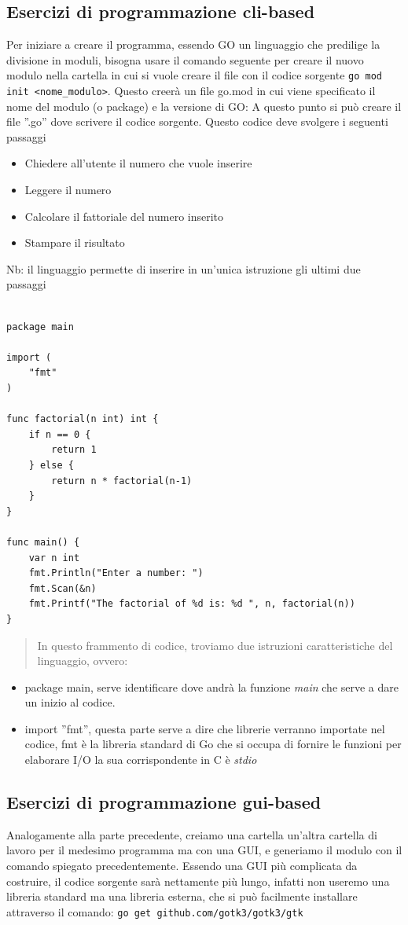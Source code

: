 \subsection{Esercizi di programmazione cli-based}
Per iniziare a creare il programma, essendo GO un linguaggio che predilige la divisione in moduli, bisogna usare il comando seguente per creare il nuovo modulo nella cartella in cui si vuole creare il file con il codice sorgente \texttt{go mod init <nome\_modulo>}.\newline 
Questo creerà un file go.mod in cui viene specificato il nome del modulo (o package) e la versione di GO:
A questo punto si può creare il file ''.go'' dove scrivere il codice sorgente.
Questo codice deve svolgere i seguenti passaggi
\begin{itemize}
\item Chiedere all'utente il numero che vuole inserire
\item Leggere il numero
\item Calcolare il fattoriale del numero inserito
\item Stampare il risultato
\end{itemize}
Nb: il linguaggio permette di inserire in un'unica istruzione gli ultimi due passaggi

\begin{lstlisting}
  
package main

import (
	"fmt"
)

func factorial(n int) int {
	if n == 0 {
		return 1
	} else {
		return n * factorial(n-1)
	}
}

func main() {
	var n int
	fmt.Println("Enter a number: ")
	fmt.Scan(&n)
	fmt.Printf("The factorial of %d is: %d ", n, factorial(n))
}
\end{lstlisting}
\begin{quote}
In questo frammento di codice, troviamo due istruzioni caratteristiche del linguaggio, ovvero:
\end{quote}
\begin{itemize}
\item package main, serve identificare dove andrà la funzione \emph{main} che serve a dare un inizio al codice.
\item  import ''fmt'', questa parte serve a dire che librerie verranno importate nel codice, fmt è la libreria standard di Go che si occupa di fornire le funzioni per elaborare I/O la sua corrispondente in C è \emph{stdio}
\end{itemize}
\subsection{Esercizi di programmazione gui-based}
Analogamente alla parte precedente, creiamo una cartella un'altra cartella di lavoro per il medesimo programma ma con una GUI, e generiamo il modulo con il comando spiegato precedentemente. Essendo una GUI più complicata da costruire, il codice sorgente sarà nettamente più lungo, infatti non useremo una libreria standard ma una libreria esterna, che si può facilmente installare attraverso il comando:
\texttt{go get github.com/gotk3/gotk3/gtk} \newline

